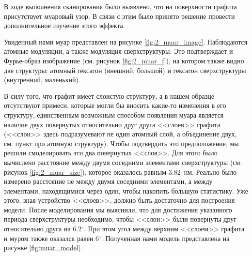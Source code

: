 \documentclass[a4paper, 12pt]{article}
\begin{document}
В ходе выполнения сканирования было выявлено, что на поверхности графита присутствует муаровый узор. В связи с этим было принято решение провести дополнительное изучение этого эффекта.

Увиденный нами муар представлен на рисунке \ref{fig:2_muar_image}. Наблюдаются атомные модуляции, а также модуляция сверхструктуры. Это подтверждает и Фурье-образ изображение (см. рисунок \ref{fig:2_muar_f}), на котором также видно две структуры: атомный гексагон (внешний, большой) и гексагон сверхструктуры (внутренний, маленький).

В силу того, что графит имеет слоистую структуру, а в нашем образце отсутствуют примеси, которые могли бы вносить какие-то изменения в его структуру, единственным возможным способом появления муара является наличие двух повернутых относительно друг друга <<слоев>> графита (<<слои>> здесь подразумевают не один атомный слой, а объединение двух, см. пункт про атомную структуру). Чтобы подтвердить это предположение, мы решили смоделировать эти два повернутых <<слоя>>. Для этого было вычислено расстояние между двумя соседними элементами сверхструктуры (см. рисунок \ref{fig:2_muar_size}), которое оказалось равным $3.82$~нм. Реально было измерено расстояние не между двумя соседними элементами, а между элементами, находящимися через один, чтобы накопить большую статистику. Уже этого, зная устройство <<слоев>>, должно быть достаточно для построения модели. После моделирования мы выяснили, что для достижения указанного периода сверхструктуры необходимо, чтобы <<слои>> были повернуты друг относительно друга на 6.2$^\circ$. При этом угол между верхним <<слоем>> графита и муром также оказался равен 6$^\circ$.
Полученная нами модель представлена на рисунке \ref{fig:muar_model}.
\end{document}
